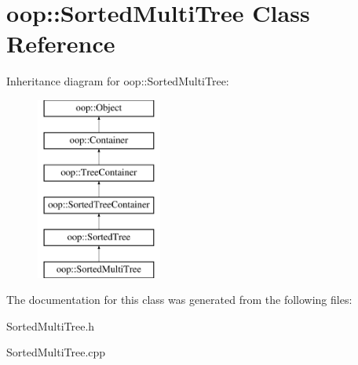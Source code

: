 \hypertarget{classoop_1_1SortedMultiTree}{\section{oop\-:\-:\-Sorted\-Multi\-Tree \-Class \-Reference}
\label{classoop_1_1SortedMultiTree}
}
\-Inheritance diagram for oop\-:\-:\-Sorted\-Multi\-Tree\-:\begin{figure}[H]
\begin{center}
\leavevmode
\includegraphics[height=6.000000cm]{classoop_1_1SortedMultiTree}
\end{center}
\end{figure}


\-The documentation for this class was generated from the following files\-:\begin{DoxyCompactItemize}
\item 
\-Sorted\-Multi\-Tree.\-h\item 
\-Sorted\-Multi\-Tree.\-cpp\end{DoxyCompactItemize}
